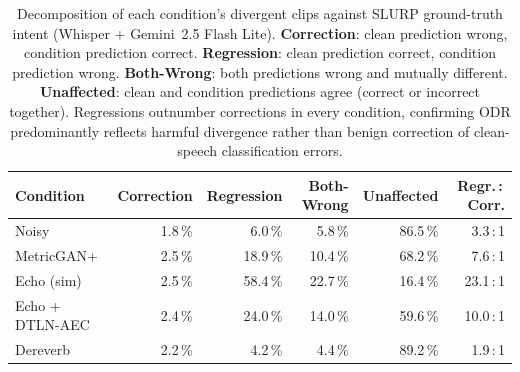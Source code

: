 \begin{table}[t]
  \centering
  \begin{tabular}{lrrrrr}
    \hline
    \textbf{Condition} & \textbf{Correction} & \textbf{Regression} &
    \textbf{Both-Wrong} & \textbf{Unaffected} & \textbf{Regr.\,:\,Corr.} \\
    \hline
    Noisy        & 1.8\,\% & 6.0\,\%  & 5.8\,\%  & 86.5\,\% & 3.3\,:\,1  \\
    MetricGAN+   & 2.5\,\% & 18.9\,\% & 10.4\,\% & 68.2\,\% & 7.6\,:\,1  \\
    Echo (sim)   & 2.5\,\% & 58.4\,\% & 22.7\,\% & 16.4\,\% & 23.1\,:\,1 \\
    Echo + DTLN-AEC & 2.4\,\% & 24.0\,\% & 14.0\,\% & 59.6\,\% & 10.0\,:\,1 \\
    Dereverb     & 2.2\,\% & 4.2\,\%  & 4.4\,\%  & 89.2\,\% & 1.9\,:\,1  \\
    \hline
  \end{tabular}
  \caption{Decomposition of each condition's divergent clips against
    SLURP ground-truth intent (Whisper + Gemini~2.5 Flash Lite).
    \textbf{Correction}: clean prediction wrong, condition prediction
    correct. \textbf{Regression}: clean prediction correct, condition
    prediction wrong. \textbf{Both-Wrong}: both predictions wrong and
    mutually different. \textbf{Unaffected}: clean and condition
    predictions agree (correct or incorrect together). Regressions
    outnumber corrections in every condition, confirming ODR
    predominantly reflects harmful divergence rather than benign
    correction of clean-speech classification errors.}
  \label{tab:correction}
\end{table}
